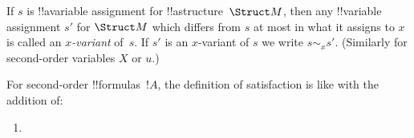 \documentclass[../../../include/open-logic-section]{subfiles}
\begin{document}
\begin{defn}[$x$-Variant]
If $s$ is !!a{variable} assignment for !!a{structure}~$\Struct M$,
then any !!{variable} assignment $s'$ for $\Struct M$ which differs
from $s$ at most in what it assigns to $x$ is called an
\emph{$x$-variant} of~$s$.  If $s'$ is an $x$-variant of $s$ we write
$s \sim_x s'$. (Similarly for second-order variables $X$ or $u$.)
\end{defn}


\begin{defn}[Satisfaction]
For second-order !!{formula}s~$!A$, the definition of satisfaction is
like  with the addition of:
\begin{enumerate}
\item {}



\end{enumerate}
\end{defn}
\end{document}
